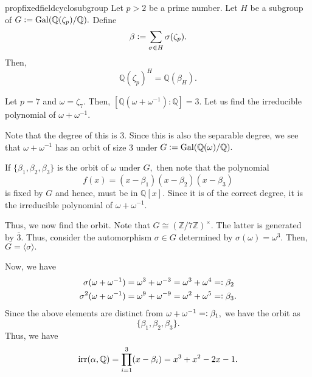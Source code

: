 \begin{restatable}[]{prop}{fixedfieldcyclosubgroup}
\label{prop:fixedfieldcyclosubgroup}
    Let $p > 2$ be a prime number. Let $H$ be a subgroup of $G \vcentcolon= \operatorname{Gal}(\mathbb{Q}(\zeta_p)/\mathbb{Q}).$ Define
    \begin{equation*} 
        \beta \vcentcolon= \sum_{\sigma \in H} \sigma(\zeta_p).
    \end{equation*}
    Then,
    \begin{equation*} 
        \mathbb{Q}(\zeta_p)^H = \mathbb{Q}(\beta_H).
    \end{equation*} 
    \hfill\hyperref[prop:fixedfieldcyclosubgroup2]{\downsym}
\end{restatable}

\begin{ex}
    Let $p = 7$ and $\omega = \zeta_7.$ Then, $[\mathbb{Q}(\omega + \omega^{-1}) : \mathbb{Q}] = 3.$ Let us find the irreducible polynomial of $\omega + \omega^{-1}.$

    Note that the degree of this is $3.$ Since this is also the separable degree, we see that $\omega + \omega^{-1}$ has an orbit of size $3$ under $G \vcentcolon= \operatorname{Gal}(\mathbb{Q}(\omega)/\mathbb{Q}).$

    If $\{\beta_1, \beta_2, \beta_3\}$ is the orbit of $\omega$ under $G,$ then note that the polynomial
    \begin{equation*} 
        f(x) = (x - \beta_1) (x - \beta_2) (x - \beta_3)
    \end{equation*}
    is fixed by $G$ and hence, must be in $\mathbb{Q}[x].$ Since it is of the correct degree, it is the irreducible polynomial of $\omega + \omega^{-1}.$

    Thus, we now find the orbit. Note that $G \cong (\mathbb{Z}/7\mathbb{Z})^\times.$ The latter is generated by $\bar{3}.$ Thus, consider the automorphism $\sigma \in G$ determined by $\sigma(\omega) = \omega^3.$ Then, $G = \langle \sigma\rangle.$

    Now, we have
    \begin{align*} 
        \sigma(\omega + \omega^{-1}) &= \omega^3 + \omega^{-3} = \omega^3 + \omega^4 =\vcentcolon \beta_2\\
        \sigma^2(\omega + \omega^{-1}) &= \omega^9 + \omega^{-9} = \omega^2 + \omega^5 =\vcentcolon \beta_3.
    \end{align*}
    Since the above elements are distinct from $\omega + \omega^{-1} =\vcentcolon \beta_1,$ we have the orbit as
    \begin{equation*} 
        \{\beta_1, \beta_2, \beta_3\}.
    \end{equation*}
    Thus, we have
    \begin{equation*} 
        \operatorname{irr}(\alpha, \mathbb{Q}) = \prod_{i = 1}^{3}(x - \beta_i) = x^3 + x^2 - 2x - 1.
    \end{equation*}
\end{ex}